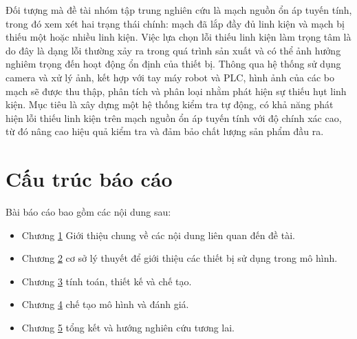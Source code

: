 Đối tượng mà đề tài nhóm tập trung nghiên cứu là mạch nguồn ổn áp tuyến tính, trong đó xem xét hai trạng thái chính: mạch đã lắp đầy đủ linh kiện và mạch bị thiếu một hoặc nhiều linh kiện. Việc lựa chọn lỗi thiếu linh kiện làm trọng tâm là do đây là dạng lỗi thường xảy ra trong quá trình sản xuất và có thể ảnh hưởng nghiêm trọng đến hoạt động ổn định của thiết bị. Thông qua hệ thống sử dụng camera và xử lý ảnh, kết hợp với tay máy robot và PLC, hình ảnh của các bo mạch sẽ được thu thập, phân tích và phân loại nhằm phát hiện sự thiếu hụt linh kiện. Mục tiêu là xây dựng một hệ thống kiểm tra tự động, có khả năng phát hiện lỗi thiếu linh kiện trên mạch nguồn ổn áp tuyến tính với độ chính xác cao, từ đó nâng cao hiệu quả kiểm tra và đảm bảo chất lượng sản phẩm đầu ra.

\section{Cấu trúc báo cáo}

Bài báo cáo bao gồm các nội dung sau:

\begin{itemize}
    \item Chương \hyperref[chap:intro]{1} Giới thiệu chung về các nội dung liên quan đến đề tài.

    \item Chương \hyperref[chap:background]{2} cơ sở lý thuyết để giới thiệu các thiết bị sử dụng trong mô hình.

    \item Chương \hyperref[chap:tombo-L1]{3} tính toán, thiết kế và chế tạo.

    \item Chương \hyperref[chap:tombo-encoder]{4} chế tạo mô hình và đánh giá.

    \item Chương \hyperref[chap:conclusion]{5} tổng kết và hướng nghiên cứu tương lai.
\end{itemize}
